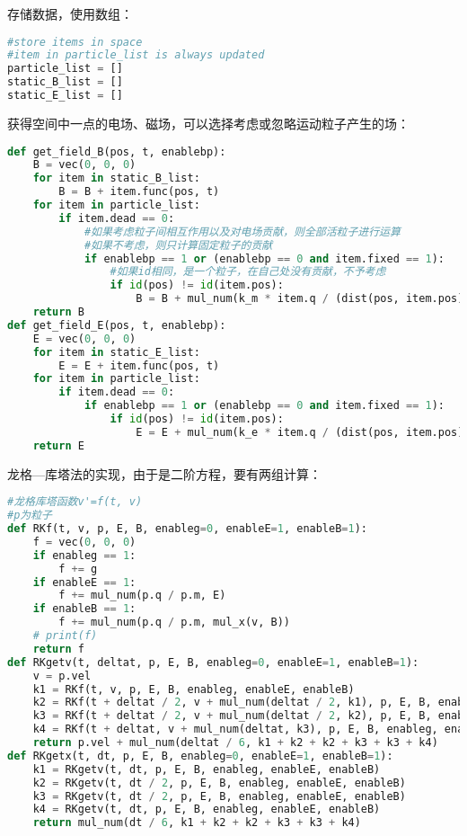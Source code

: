 \documentclass[UTF-8,cs4size]{ctexart}
\begin{document}
存储数据，使用数组：
\begin{lstlisting}[language=Python]
#store items in space
#item in particle_list is always updated
particle_list = []
static_B_list = []
static_E_list = []
\end{lstlisting}
获得空间中一点的电场、磁场，可以选择考虑或忽略运动粒子产生的场：
\begin{lstlisting}[language=Python]
def get_field_B(pos, t, enablebp):
    B = vec(0, 0, 0)
    for item in static_B_list:
        B = B + item.func(pos, t)
    for item in particle_list:
        if item.dead == 0:
            #如果考虑粒子间相互作用以及对电场贡献，则全部活粒子进行运算
            #如果不考虑，则只计算固定粒子的贡献
            if enablebp == 1 or (enablebp == 0 and item.fixed == 1):
                #如果id相同，是一个粒子，在自己处没有贡献，不予考虑
                if id(pos) != id(item.pos):
                    B = B + mul_num(k_m * item.q / (dist(pos, item.pos) ** 3), mul_x(item.vel, (pos - item.pos)))
    return B
def get_field_E(pos, t, enablebp):
    E = vec(0, 0, 0)
    for item in static_E_list:
        E = E + item.func(pos, t)
    for item in particle_list:
        if item.dead == 0:
            if enablebp == 1 or (enablebp == 0 and item.fixed == 1):
                if id(pos) != id(item.pos):
                    E = E + mul_num(k_e * item.q / (dist(pos, item.pos) ** 3), pos - item.pos)
    return E
\end{lstlisting}
龙格—库塔法的实现，由于是二阶方程，要有两组计算：
\begin{lstlisting}[language=Python]
#龙格库塔函数v'=f(t, v)
#p为粒子
def RKf(t, v, p, E, B, enableg=0, enableE=1, enableB=1):
    f = vec(0, 0, 0)
    if enableg == 1:
        f += g
    if enableE == 1:
        f += mul_num(p.q / p.m, E)
    if enableB == 1:
        f += mul_num(p.q / p.m, mul_x(v, B))
    # print(f)
    return f
def RKgetv(t, deltat, p, E, B, enableg=0, enableE=1, enableB=1):
    v = p.vel
    k1 = RKf(t, v, p, E, B, enableg, enableE, enableB)
    k2 = RKf(t + deltat / 2, v + mul_num(deltat / 2, k1), p, E, B, enableg, enableE, enableB)
    k3 = RKf(t + deltat / 2, v + mul_num(deltat / 2, k2), p, E, B, enableg, enableE, enableB)
    k4 = RKf(t + deltat, v + mul_num(deltat, k3), p, E, B, enableg, enableE, enableB)
    return p.vel + mul_num(deltat / 6, k1 + k2 + k2 + k3 + k3 + k4)
def RKgetx(t, dt, p, E, B, enableg=0, enableE=1, enableB=1):
    k1 = RKgetv(t, dt, p, E, B, enableg, enableE, enableB)
    k2 = RKgetv(t, dt / 2, p, E, B, enableg, enableE, enableB)
    k3 = RKgetv(t, dt / 2, p, E, B, enableg, enableE, enableB)
    k4 = RKgetv(t, dt, p, E, B, enableg, enableE, enableB)
    return mul_num(dt / 6, k1 + k2 + k2 + k3 + k3 + k4)
\end{lstlisting}
\end{document}
